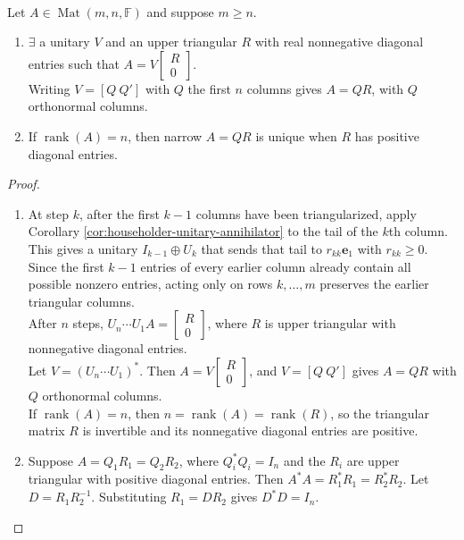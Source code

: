 \begin{theorem} \label{thm:qr-factorization} \\
Let $A\in\operatorname{Mat}(m,n,\mathbb{F})$ and suppose $m\geq n$.
\begin{enumerate}[label=(\roman*)]
\setlength{\itemsep}{0pt}
\item $\exists$ a unitary $V$ and an upper triangular $R$ with real nonnegative diagonal entries such that $A=V\begin{bmatrix}R\\0\end{bmatrix}$.\\
Writing $V=[Q\ Q']$ with $Q$ the first $n$ columns gives $A=QR$, with $Q$ orthonormal columns.
\item If $\operatorname{rank}(A)=n$, then narrow $A=QR$ is unique when $R$ has positive diagonal entries.
\end{enumerate}
\begin{proof}
\begin{enumerate}[label=(\roman*)]
\setlength{\itemsep}{0pt}
\item
At step $k$, after the first $k-1$ columns have been triangularized, apply Corollary \ref{cor:householder-unitary-annihilator} to the tail of the $k$th column. This gives a unitary $I_{k-1}\oplus U_k$ that sends that tail to $r_{kk}\mathbf{e}_1$ with $r_{kk}\geq0$.\\
Since the first $k-1$ entries of every earlier column already contain all possible nonzero entries, acting only on rows $k,\ldots,m$ preserves the earlier triangular columns.\\
After $n$ steps, $U_n\cdots U_1A=\begin{bmatrix}R\\0\end{bmatrix}$, where $R$ is upper triangular with nonnegative diagonal entries.\\
Let $V=(U_n\cdots U_1)^*$. Then $A=V\begin{bmatrix}R\\0\end{bmatrix}$, and $V=[Q\ Q']$ gives $A=QR$ with $Q$ orthonormal columns.\\
If $\operatorname{rank}(A)=n$, then $n=\operatorname{rank}(A)=\operatorname{rank}(R)$, so the triangular matrix $R$ is invertible and its nonnegative diagonal entries are positive.
\item
Suppose $A=Q_1R_1=Q_2R_2$, where $Q_i^*Q_i=I_n$ and the $R_i$ are upper triangular with positive diagonal entries. Then $A^*A=R_1^*R_1=R_2^*R_2$. Let $D=R_1R_2^{-1}$. Substituting $R_1=DR_2$ gives $D^*D=I_n$.\\

\end{enumerate}
\end{proof}
\end{theorem}
